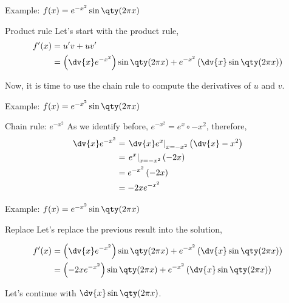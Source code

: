 \documentclass[../tufte-style.tex]{standalone}
\begin{document}
\begin{frame}{Example: \(f(x) = e^{-x^2}\sin\qty(2\pi x)\) }

\begin{block}{Product rule}
Let's start with the product rule,
\begin{align*}
    f'(x) &= u'v + uv' \\
          &= \left(\dv{x}e^{-x^2}\right)\sin\qty(2\pi x) + e^{-x^2}\left(\dv{x}\sin\qty(2\pi x)\right)
\end{align*}

\vspace{2em}

Now, it is time to use the chain rule to compute the derivatives of \(u\) and \(v\).

\end{block}

\end{frame}

\begin{frame}{Example: \(f(x) = e^{-x^2}\sin\qty(2\pi x)\) }

\begin{block}{Chain rule: \(e^{-x^2}\)}
As we identify before, \(e^{-x^2} = e^{x}\circ -x^{2}\), therefore,
\begin{align*}
    \dv{x}e^{-x^2} &= \left. \dv{x}e^{x} \right|_{x=-x^{2}}\left(\dv{x}-x^{2}\right)  \\
                   &= \left. e^{x} \right|_{x=-x^{2}}\left(-2x\right)  \\ 
                   &= e^{-x^{2}}\left(-2x\right)  \\
                   &= -2xe^{-x^{2}}
\end{align*}

\end{block}

\end{frame}

\begin{frame}{Example: \(f(x) = e^{-x^2}\sin\qty(2\pi x)\) }

\begin{block}{Replace}
Let's replace the previous result into the solution,

\begin{align*}
    f'(x) &= \left(\dv{x}e^{-x^2}\right)\sin\qty(2\pi x) + e^{-x^2}\left(\dv{x}\sin\qty(2\pi x)\right) \\
          &= \left(-2xe^{-x^{2}}\right)\sin\qty(2\pi x) + e^{-x^2}\left(\dv{x}\sin\qty(2\pi x)\right)
\end{align*}

\end{block}

\vspace{1em}

Let's continue with \(\dv{x}\sin\qty(2\pi x)\).

\end{frame}
\end{document}
